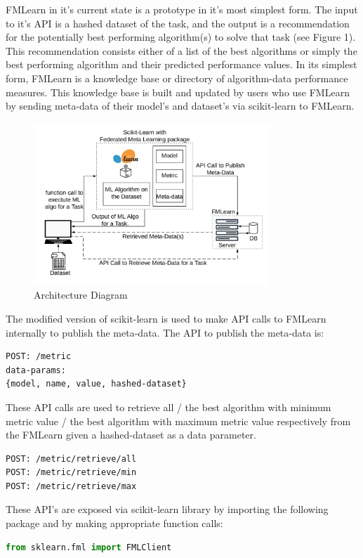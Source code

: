 \documentclass{article}
\begin{document}
FMLearn in it's current state is a prototype in it's most simplest form. The input to it's API is a hashed dataset of the task, and the output is a recommendation for the potentially best performing algorithm(s) to solve that task (see Figure 1). This recommendation consists either of a list of the best algorithms or simply the best performing algorithm and their predicted performance values. In its simplest form, FMLearn is a knowledge base or directory of algorithm-data performance measures. This knowledge base is built and updated by users who use FMLearn by sending meta-data of their model’s and dataset’s  via scikit-learn to FMLearn.

\begin{figure}[ht]
    \centering
    \includegraphics[width=3.5in]{architecture-diagram.jpeg}
    \caption{Architecture Diagram}
    \label{architecture-diagram}
\end{figure}

The modified version of scikit-learn is used to make API calls to FMLearn internally to publish the meta-data. The API to publish the meta-data is:
\begin{lstlisting}
POST: /metric
data-params: 
{model, name, value, hashed-dataset}
\end{lstlisting}

These API calls are used to retrieve all / the best algorithm with minimum metric value / the best algorithm with maximum metric value respectively from the FMLearn given a hashed-dataset as a data parameter.
\begin{lstlisting}
POST: /metric/retrieve/all
POST: /metric/retrieve/min
POST: /metric/retrieve/max
\end{lstlisting}

These API's are exposed via scikit-learn library by importing the following package and by making appropriate function calls:
\begin{lstlisting}[language=python]
from sklearn.fml import FMLClient
\end{lstlisting}
\end{document}
